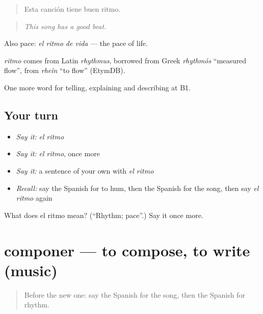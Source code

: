 \begin{quote}
Esta canción tiene buen ritmo.
\end{quote}

\begin{quote}
\emph{This song has a good beat.}
\end{quote}

Also pace: \emph{el ritmo de vida} — the pace of life.

\begin{cousinweb}
\emph{ritmo} comes from Latin \emph{rhythmus}, borrowed from Greek \emph{rhythmós} \textquotedblleft{}measured flow\textquotedblright{}, from \emph{rheîn} \textquotedblleft{}to flow\textquotedblright{} (EtymDB).
\end{cousinweb}

\begin{grammarlens}[title={What you've built}]
One more word for telling, explaining and describing at B1.
\end{grammarlens}

\subsection*{Your turn}
\begin{itemize}
\raggedright
  \item \emph{Say it:} \emph{el ritmo}
  \item \emph{Say it:} \emph{el ritmo}, once more
  \item \emph{Say it:} a sentence of your own with \emph{el ritmo}
  \item \emph{Recall:} say the Spanish for to hum, then the Spanish for the song, then say \emph{el ritmo} again
\end{itemize}

\begin{tcolorbox}[breakable,colback=teal!4,colframe=teal!35!black,title={Before you move on}]
What does el ritmo mean? (\textquotedblleft{}Rhythm; pace\textquotedblright{}.) Say it once more.
\end{tcolorbox}
\section[componer]{componer — to compose, to write (music)}

\label{lesson:ES-C753-componer}



\begin{quote}
Before the new one: say the Spanish for the song, then the Spanish for rhythm.
\end{quote}

